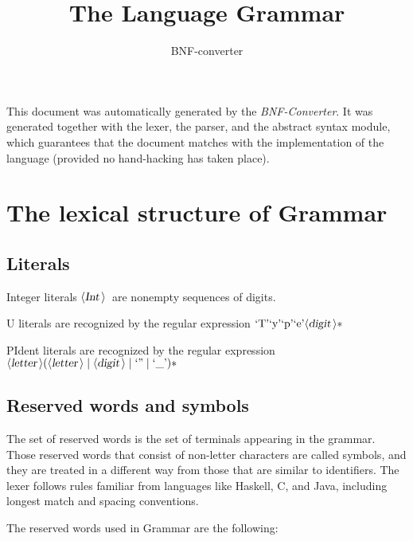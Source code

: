 \documentclass[a4paper,11pt]{article}
\author{BNF-converter}
\title{The Language Grammar}
\begin{document}
\maketitle

\newcommand{\emptyP}{\mbox{$\epsilon$}}
\newcommand{\terminal}[1]{\mbox{{\texttt {#1}}}}
\newcommand{\nonterminal}[1]{\mbox{$\langle \mbox{{\sl #1 }} \! \rangle$}}
\newcommand{\arrow}{\mbox{::=}}
\newcommand{\delimit}{\mbox{$|$}}
\newcommand{\reserved}[1]{\mbox{{\texttt {#1}}}}
\newcommand{\literal}[1]{\mbox{{\texttt {#1}}}}
\newcommand{\symb}[1]{\mbox{{\texttt {#1}}}}

This document was automatically generated by the {\em BNF-Converter}. It was generated together with the lexer, the parser, and the abstract syntax module, which guarantees that the document matches with the implementation of the language (provided no hand-hacking has taken place).

\section*{The lexical structure of Grammar}

\subsection*{Literals}
Integer literals \nonterminal{Int}\ are nonempty sequences of digits.





U literals are recognized by the regular expression
\(\mbox{`T'} \mbox{`y'} \mbox{`p'} \mbox{`e'} {\nonterminal{digit}}*\)

PIdent literals are recognized by the regular expression
\({\nonterminal{letter}} ({\nonterminal{letter}} \mid {\nonterminal{digit}} \mid \mbox{`''} \mid \mbox{`\_'})*\)


\subsection*{Reserved words and symbols}
The set of reserved words is the set of terminals appearing in the grammar. Those reserved words that consist of non-letter characters are called symbols, and they are treated in a different way from those that are similar to identifiers. The lexer follows rules familiar from languages like Haskell, C, and Java, including longest match and spacing conventions.

The reserved words used in Grammar are the following: \\
\end{document}
